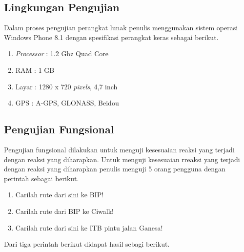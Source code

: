 \subsection{Lingkungan Pengujian}
\label{lab:Lingkungan Pengujian}
\hspace{0.5cm} Dalam proses pengujian perangkat lunak penulis menggunakan sistem operasi Windows Phone 8.1 dengan spesifikasi perangkat keras sebagai berikut.
\begin{enumerate}
	\item \textit{Processor} : 1.2 Ghz Quad Core
	\item RAM : 1 GB
	\item Layar : 1280 x 720 \textit{pixels}, 4,7 inch
	\item GPS : A-GPS, GLONASS, Beidou
\end{enumerate}

\subsection{Pengujian Fungsional}
\label{lab:Pengujian Fungsional}
\hspace{0.5cm} Pengujian fungsional dilakukan untuk menguji kesesuaian reaksi yang terjadi dengan reaksi yang diharapkan. Untuk menguji kesesuaian rreaksi yang terjadi dengan reaksi yang diharapkan penulis menguji 5 orang pengguna dengan perintah sebagai berikut. 
\begin{enumerate}
	\item Carilah rute dari sini ke BIP!
	\item Carilah rute dari BIP ke Ciwalk!
	\item Carilah rute dari sini ke ITB pintu jalan Ganesa!
\end{enumerate}

Dari tiga perintah berikut didapat hasil sebagi berikut.

